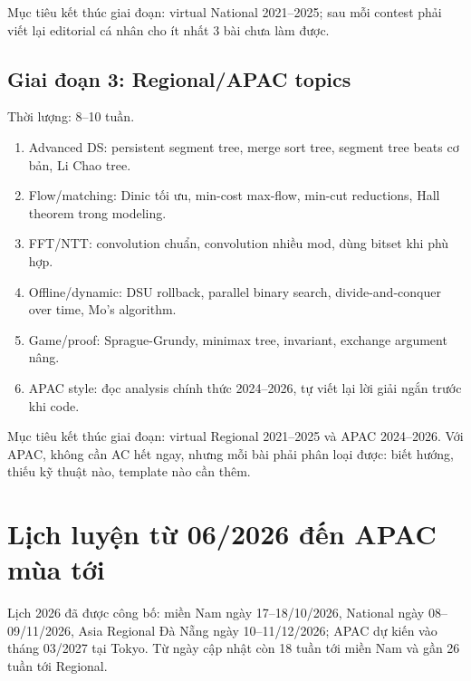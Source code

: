 \documentclass[11pt,a4paper]{article}
\begin{document}
Mục tiêu kết thúc giai đoạn: virtual National 2021--2025; sau mỗi contest phải viết lại editorial cá nhân cho ít nhất 3 bài chưa làm được.

\subsection{Giai đoạn 3: Regional/APAC topics}

Thời lượng: 8--10 tuần.

\begin{enumerate}
  \item Advanced DS: persistent segment tree, merge sort tree, segment tree beats cơ bản, Li Chao tree.
  \item Flow/matching: Dinic tối ưu, min-cost max-flow, min-cut reductions, Hall theorem trong modeling.
  \item FFT/NTT: convolution chuẩn, convolution nhiều mod, dùng bitset khi phù hợp.
  \item Offline/dynamic: DSU rollback, parallel binary search, divide-and-conquer over time, Mo's algorithm.
  \item Game/proof: Sprague-Grundy, minimax tree, invariant, exchange argument nâng.
  \item APAC style: đọc analysis chính thức 2024--2026, tự viết lại lời giải ngắn trước khi code.
\end{enumerate}

Mục tiêu kết thúc giai đoạn: virtual Regional 2021--2025 và APAC 2024--2026. Với APAC, không cần AC hết ngay, nhưng mỗi bài phải phân loại được: biết hướng, thiếu kỹ thuật nào, template nào cần thêm.

\section{Lịch luyện từ 06/2026 đến APAC mùa tới}

Lịch 2026 đã được công bố: miền Nam ngày 17--18/10/2026, National ngày 08--09/11/2026, Asia Regional Đà Nẵng ngày 10--11/12/2026; APAC dự kiến vào tháng 03/2027 tại Tokyo. Từ ngày cập nhật còn 18 tuần tới miền Nam và gần 26 tuần tới Regional.
\end{document}
